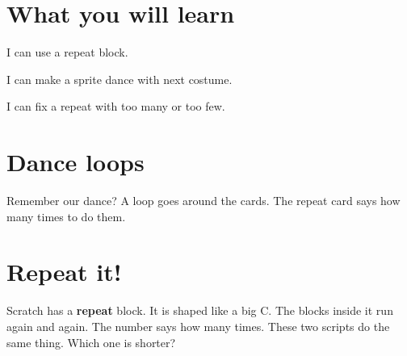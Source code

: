 
\section{What you will learn}
\begin{ican}
  \item I can use a repeat block.
  \item I can make a sprite dance with next costume.
  \item I can fix a repeat with too many or too few.
\end{ican}

\section{Dance loops}
Remember our dance? A loop goes around the cards. The repeat card says how many times to do them.

\begin{center}
\end{center}

\section{Repeat it!}
Scratch has a \textbf{repeat} block. It is shaped like a big C. The blocks inside it run again and again. The number says how many times. These two scripts do the same thing. Which one is shorter?

